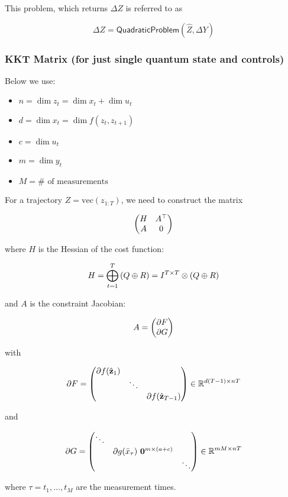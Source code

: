 \documentclass{article}
\begin{document}
\hfill

This problem, which returns $\Delta Z$ is referred to as 

$$
\boxed{
\Delta Z = \textsf{QuadraticProblem}(\hat Z, \Delta Y)
}
$$

\subsubsection*{KKT Matrix (for just single quantum state and controls)}

Below we use:

\begin{itemize}
  \item $n = \dim z_t = \dim x_t + \dim u_t $ 
  \item $d = \dim x_t = \dim f(z_t, z_{t+1}) $ 
  \item $c = \dim u_t$  
  \item $m = \dim y_t$ 
  \item $M = \#\text{ of measurements}$
\end{itemize}



For a trajectory $Z = \text{vec}(z_{1:T})$, we need to construct the matrix

$$
\mqty(
  H & A^\top \\
  A & 0
)
$$


where $H$ is the Hessian of the cost function:

$$
H = \bigoplus_{t=1}^T \qty(Q \oplus R) = I^{T \times T} \otimes \qty(Q \oplus R)
$$


and $A$ is the constraint Jacobian:

$$
A = \mqty(
  \partial F \\
  \partial G
)
$$

with 

$$
\partial F = \mqty(
  \partial f(\hat{\vb{z}}_1) \\
  & \ddots \\
  & & \partial f(\hat{\vb{z}}_{T-1})
) \in \mathbb{R}^{d (T - 1) \times n T}
$$

and

$$
\partial G = \mqty(
  \ddots \\
  & \partial g(\bar x_{\tau}) \ \vb{0}^{m \times (a + c)} \\
  & & \ddots
) \in \mathbb{R}^{m M \times n T}
$$

where $\tau = t_1, \dots, t_M$ are the measurement times.

\hfill
\end{document}
